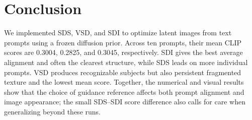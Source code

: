 \section{Conclusion}
\label{sec:conclusion}

We implemented SDS, VSD, and SDI to optimize latent images from text prompts using a frozen diffusion prior. Across ten prompts, their mean CLIP scores are 0.3004, 0.2825, and 0.3045, respectively. SDI gives the best average alignment and often the clearest structure, while SDS leads on more individual prompts. VSD produces recognizable subjects but also persistent fragmented texture and the lowest mean score. Together, the numerical and visual results show that the choice of guidance reference affects both prompt alignment and image appearance; the small SDS--SDI score difference also calls for care when generalizing beyond these runs.

